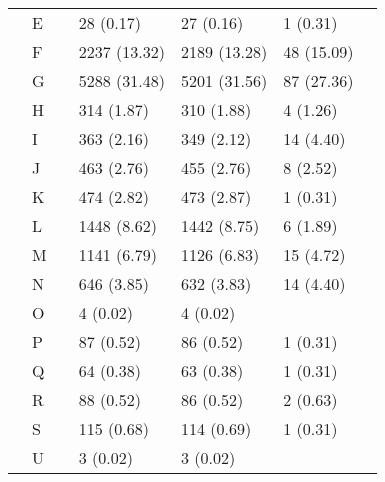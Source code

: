 \begin{tabular}{lllllll}
{{ & E &  & 28 (0.17) & 27 (0.16) & 1 (0.31) &  \\
 & F &  & 2237 (13.32) & 2189 (13.28) & 48 (15.09) &  \\
 & G &  & 5288 (31.48) & 5201 (31.56) & 87 (27.36) &  \\
 & H &  & 314 (1.87) & 310 (1.88) & 4 (1.26) &  \\
 & I &  & 363 (2.16) & 349 (2.12) & 14 (4.40) &  \\
 & J &  & 463 (2.76) & 455 (2.76) & 8 (2.52) &  \\
 & K &  & 474 (2.82) & 473 (2.87) & 1 (0.31) &  \\
 & L &  & 1448 (8.62) & 1442 (8.75) & 6 (1.89) &  \\
 & M &  & 1141 (6.79) & 1126 (6.83) & 15 (4.72) &  \\
 & N &  & 646 (3.85) & 632 (3.83) & 14 (4.40) &  \\
 & O &  & 4 (0.02) & 4 (0.02) &  &  \\
 & P &  & 87 (0.52) & 86 (0.52) & 1 (0.31) &  \\
 & Q &  & 64 (0.38) & 63 (0.38) & 1 (0.31) &  \\
 & R &  & 88 (0.52) & 86 (0.52) & 2 (0.63) &  \\
 & S &  & 115 (0.68) & 114 (0.69) & 1 (0.31) &  \\
 & U &  & 3 (0.02) & 3 (0.02) &  &  \\
\cline{1-7}
\bottomrule
\end{tabular}
